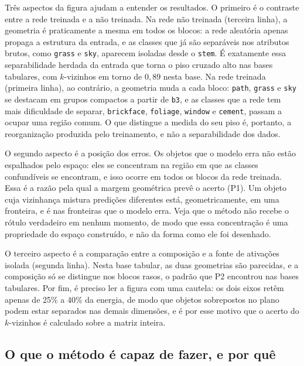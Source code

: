 Três aspectos da figura ajudam a entender os resultados. O primeiro é o contraste entre a rede treinada e a não treinada. Na rede não treinada (terceira linha), a geometria é praticamente a mesma em todos os blocos: a rede aleatória apenas propaga a estrutura da entrada, e as classes que já são separáveis nos atributos brutos, como \texttt{grass} e \texttt{sky}, aparecem isoladas desde o \texttt{stem}. É exatamente essa separabilidade herdada da entrada que torna o piso cruzado alto nas bases tabulares, com $k$-vizinhos em torno de $0{,}89$ nesta base. Na rede treinada (primeira linha), ao contrário, a geometria muda a cada bloco: \texttt{path}, \texttt{grass} e \texttt{sky} se destacam em grupos compactos a partir de \texttt{b3}, e as classes que a rede tem mais dificuldade de separar, \texttt{brickface}, \texttt{foliage}, \texttt{window} e \texttt{cement}, passam a ocupar uma região comum. O que distingue a medida do seu piso é, portanto, a reorganização produzida pelo treinamento, e não a separabilidade dos dados.

O segundo aspecto é a posição dos erros. Os objetos que o modelo erra não estão espalhados pelo espaço: eles se concentram na região em que as classes confundíveis se encontram, e isso ocorre em todos os blocos da rede treinada. Essa é a razão pela qual a margem geométrica prevê o acerto (P1). Um objeto cuja vizinhança mistura predições diferentes está, geometricamente, em uma fronteira, e é nas fronteiras que o modelo erra. Veja que o método não recebe o rótulo verdadeiro em nenhum momento, de modo que essa concentração é uma propriedade do espaço construído, e não da forma como ele foi desenhado.

O terceiro aspecto é a comparação entre a composição e a fonte de ativações isolada (segunda linha). Nesta base tabular, as duas geometrias são parecidas, e a composição só se distingue nos blocos rasos, o padrão que P2 encontrou nas bases tabulares. Por fim, é preciso ler a figura com uma cautela: os dois eixos retêm apenas de 25\% a 40\% da energia, de modo que objetos sobrepostos no plano podem estar separados nas demais dimensões, e é por esse motivo que o acerto do $k$-vizinhos é calculado sobre a matriz inteira.

\subsection{O que o método é capaz de fazer, e por quê}\label{subsec:res_instanciacao}

